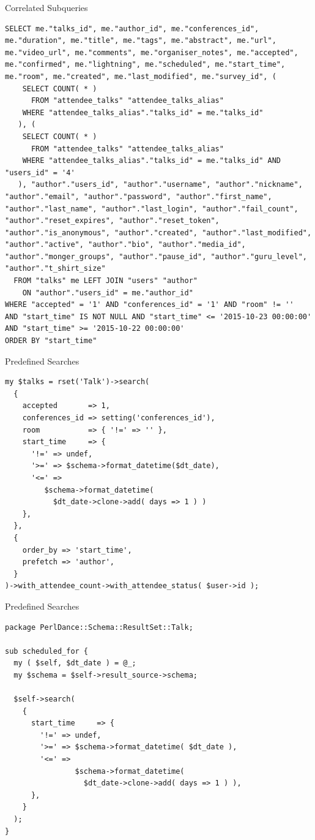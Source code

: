 \begin{frame}[fragile]{Correlated Subqueries}
\begin{lstlisting}
SELECT me."talks_id", me."author_id", me."conferences_id", me."duration", me."title", me."tags", me."abstract", me."url", me."video_url", me."comments", me."organiser_notes", me."accepted", me."confirmed", me."lightning", me."scheduled", me."start_time", me."room", me."created", me."last_modified", me."survey_id", ( 
    SELECT COUNT( * ) 
      FROM "attendee_talks" "attendee_talks_alias" 
    WHERE "attendee_talks_alias"."talks_id" = me."talks_id"
   ), ( 
    SELECT COUNT( * ) 
      FROM "attendee_talks" "attendee_talks_alias" 
    WHERE "attendee_talks_alias"."talks_id" = me."talks_id" AND "users_id" = '4'
   ), "author"."users_id", "author"."username", "author"."nickname", "author"."email", "author"."password", "author"."first_name", "author"."last_name", "author"."last_login", "author"."fail_count", "author"."reset_expires", "author"."reset_token", "author"."is_anonymous", "author"."created", "author"."last_modified", "author"."active", "author"."bio", "author"."media_id", "author"."monger_groups", "author"."pause_id", "author"."guru_level", "author"."t_shirt_size" 
  FROM "talks" me LEFT JOIN "users" "author" 
    ON "author"."users_id" = me."author_id" 
WHERE "accepted" = '1' AND "conferences_id" = '1' AND "room" != '' 
AND "start_time" IS NOT NULL AND "start_time" <= '2015-10-23 00:00:00' 
AND "start_time" >= '2015-10-22 00:00:00' 
ORDER BY "start_time"
\end{lstlisting}
\end{frame}

\begin{frame}[fragile]{Predefined Searches}
\begin{lstlisting}
my $talks = rset('Talk')->search(
  {
    accepted       => 1,
    conferences_id => setting('conferences_id'),
    room           => { '!=' => '' },
    start_time     => {
      '!=' => undef,
      '>=' => $schema->format_datetime($dt_date),
      '<=' =>
         $schema->format_datetime( 
           $dt_date->clone->add( days => 1 ) )
    },
  },
  {
    order_by => 'start_time',
    prefetch => 'author',
  }
)->with_attendee_count->with_attendee_status( $user->id );
\end{lstlisting}
\end{frame}


\begin{frame}[fragile]{Predefined Searches}
\begin{lstlisting}
package PerlDance::Schema::ResultSet::Talk;

sub scheduled_for {
  my ( $self, $dt_date ) = @_;
  my $schema = $self->result_source->schema;

  $self->search(
    {
      start_time     => {
        '!=' => undef,
        '>=' => $schema->format_datetime( $dt_date ),
        '<=' =>
                $schema->format_datetime( 
                  $dt_date->clone->add( days => 1 ) ),
      },
    }
  );
}
\end{lstlisting}
\end{frame}


